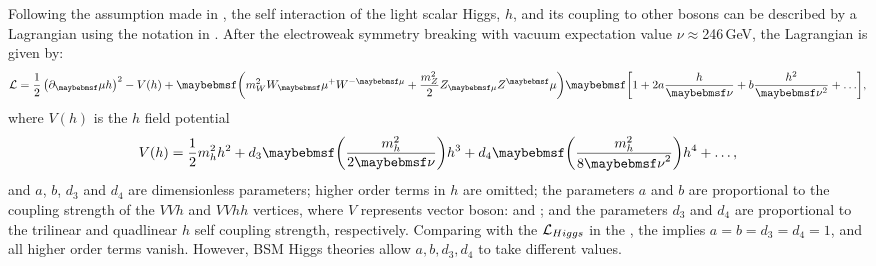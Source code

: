 Following the assumption made in  \cite{Contino:2010mh,Contino:2013gna}, the self interaction of the light scalar Higgs, $h$, and its coupling to other \SM bosons can be described by a Lagrangian using the notation in  \cite{Contino:2013gna}. After the electroweak symmetry breaking with vacuum expectation value $\nu \approx$246\,GeV, the  Lagrangian is given by:
\begin{equation}
\Lagr =\frac{1}{2}\left(\partial_\mu{h}\right)^2  - V(h) + \parenths{m_W^2{W}_\mu^+{W}^{-\mu} + \frac{m_Z^2}{2}Z_{\mu}Z^\mu}\sqbracs{1 + 2a\frac{h}{\nu} + b \frac{h^2}{\nu^2} + \hdots},
\end{equation}
where $V(h)$ is the $h$ field potential
\begin{equation}
V(h) = \frac{1}{2}m_h^2h^2 + d_3\parenths{\frac{m_h^2}{2\nu}}h^3 + d_4\parenths{\frac{m_h^2}{8{\nu}^2}}h^4 + \hdots ,
\end{equation}
and $a$, $b$, $d_3$ and $d_4$ are  dimensionless parameters; higher order terms in $h$ are omitted; the parameters $a$ and $b$ are proportional to the coupling strength of the $VVh$ and $VVhh$ vertices, where $V$ represents vector boson: \PWpm and \PZ; and the parameters $d_3$ and $d_4$ are proportional to the trilinear and quadlinear $h$ self coupling strength, respectively. Comparing with the  $\operatorname{\mathcal{L}}_{Higgs} $ in the \SM,  the \SM implies $a=b=d_3=d_4=1$, and all higher order terms vanish. However, BSM Higgs theories allow $a,b,d_3,d_4$ to take different values.

